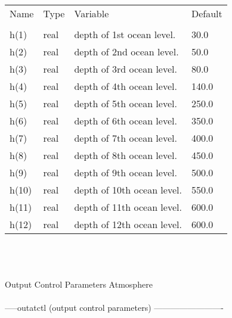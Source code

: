 \begin{tabular}{llll}
Name	&    Type  &	Variable			    &		Default    \\
\\ 
\hline
h(1)    &    real    &	depth of 1st ocean level.   	            &          30.0   \\
h(2)    &    real    &	depth of 2nd ocean level.     	            &          50.0   \\
h(3)    &    real    &	depth of 3rd ocean level.                   &          80.0   \\	
h(4)    &    real    &	depth of 4th ocean level.	            &          140.0  \\	
h(5)    &    real    &	depth of 5th ocean level.	            &          250.0  \\	
h(6)    &    real    &	depth of 6th ocean level.	            &          350.0  \\     	
h(7)    &    real    &	depth of 7th ocean level.                   &          400.0  \\ 
h(8)    &    real    &	depth of 8th ocean level.   	            &          450.0  \\
h(9)    &    real    &	depth of 9th ocean level.     	            &          500.0  \\
h(10)   &    real    &	depth of 10th ocean level.                  &          550.0  \\	
h(11)   &    real    &	depth of 11th ocean level.	            &          600.0  \\	
h(12)   &    real    &	depth of 12th ocean level.	            &          600.0  \\ \hline	
\end{tabular} \\
\\
\\
   Output Control Parameters Atmosphere\\ \\
-----outatctl  (output control parameters) -------------------------     \\

